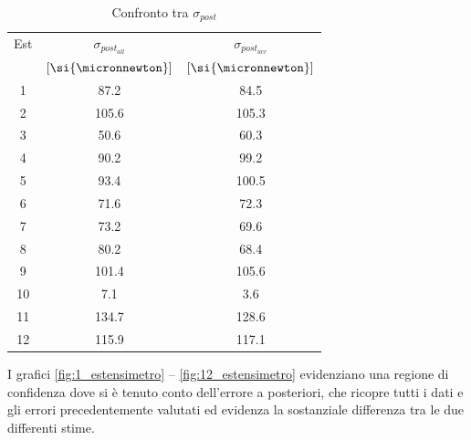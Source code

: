 \documentclass[a4paper,11pt,oneside]{article}
\begin{document}
\begin{table}
\centering
\caption{Confronto tra $\sigma_{post}$}
\label{tab:confronto_sigma_posteriori}
    \begin{tabular}{|c|c|c|}
    \hline
    Est & $\sigma_{post_{all}}$ & $\sigma_{post_{acc}}$ \\
        & $[\si{\micronnewton}]$ & $[\si{\micronnewton}]$  \\\hline
    {\cellcolor[rgb]{0.85,0.85,0.85}}1   & {\cellcolor[rgb]{0.85,0.85,0.85}}87.2       & {\cellcolor[rgb]{0.85,0.85,0.85}}84.5        \\\hline
    2   & 105.6       & 105.3        \\\hline
    {\cellcolor[rgb]{0.85,0.85,0.85}}3   & {\cellcolor[rgb]{0.85,0.85,0.85}}50.6       & {\cellcolor[rgb]{0.85,0.85,0.85}}60.3        \\\hline
    4   & 90.2       & 99.2        \\\hline
    {\cellcolor[rgb]{0.85,0.85,0.85}}5   & {\cellcolor[rgb]{0.85,0.85,0.85}}93.4       & {\cellcolor[rgb]{0.85,0.85,0.85}}100.5        \\\hline
    6   & 71.6       & 72.3        \\\hline
    {\cellcolor[rgb]{0.85,0.85,0.85}}7   & {\cellcolor[rgb]{0.85,0.85,0.85}}73.2       & {\cellcolor[rgb]{0.85,0.85,0.85}}69.6         \\\hline
    8   & 80.2       & 68.4        \\\hline
    {\cellcolor[rgb]{0.85,0.85,0.85}}9   & {\cellcolor[rgb]{0.85,0.85,0.85}}101.4       & {\cellcolor[rgb]{0.85,0.85,0.85}}105.6        \\\hline
    10  & 7.1       & 3.6        \\\hline\hline
    {\cellcolor[rgb]{0.85,0.85,0.85}}11   & {\cellcolor[rgb]{0.85,0.85,0.85}}134.7      & {\cellcolor[rgb]{0.85,0.85,0.85}}128.6       \\\hline
    12  & 115.9      & 117.1       \\\hline

    \end{tabular}
\end{table}

I grafici \ref{fig:1_estensimetro} -- \ref{fig:12_estensimetro} evidenziano una regione di confidenza dove si è tenuto conto dell'errore a posteriori, che ricopre tutti i dati e gli errori precedentemente valutati ed evidenza la sostanziale differenza tra le due differenti stime.
\end{document}

